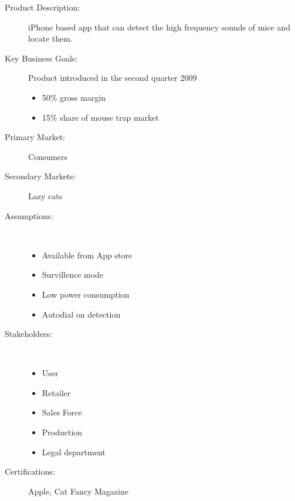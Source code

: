 \begin{description}
\item [Product Description:] iPhone based app that can detect the high frequency sounds of mice and locate them.

\item [Key Business Goals:] Product introduced in the second quarter 2009
\begin{itemize}
\item 50\% gross margin
\item 15\% share of mouse trap market
\end{itemize}

\item [Primary Market:] Consumers
\item [Secondary Markets:] Lazy cats

\item [Assumptions:]  ~~ \\
\begin{itemize}
\item Available from App store
\item Survillence mode
\item Low power consumption
\item Autodial on detection
\end{itemize}

\item [Stakeholders:]  ~~ \\
\begin{itemize}
\item User
\item Retailer
\item Sales Force
\item Production
\item Legal department
\end{itemize}

\item [Certifications:] Apple, Cat Fancy Magazine
\end{description}

